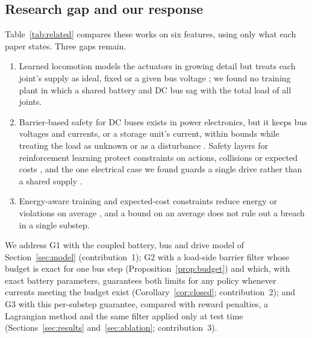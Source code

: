 \subsection{Research gap and our response}\label{sec:gap}
Table~\ref{tab:related} compares these works on six features, using only what each paper states. Three gaps remain.
\begin{enumerate}
\item[G1.] Learned locomotion models the actuators in growing detail but treats each joint's supply as ideal, fixed or a given bus voltage \cite{bjelonic2026pace,tao2026actuator,zhang2026vra}; we found no training plant in which a shared battery and DC bus sag with the total load of all joints.
\item[G2.] Barrier-based safety for DC buses exists in power electronics, but it keeps bus voltages and currents, or a storage unit's current, within bounds while treating the load as unknown or as a disturbance \cite{kosaraju2022microgrid,fu2026bess}. Safety layers for reinforcement learning protect constraints on actions, collisions or expected costs \cite{dalal2018safety,tordesillas2023rayen,he2024abs,achiam2017cpo}, and the one electrical case we found guards a single drive rather than a shared supply \cite{schenke2023safe}.
\item[G3.] Energy-aware training and expected-cost constraints reduce energy or violations on average \cite{valsecchi2024power,nai2025power,huang2026eco,achiam2017cpo}, and a bound on an average does not rule out a breach in a single substep.
\end{enumerate}
We address G1 with the coupled battery, bus and drive model of Section~\ref{sec:model} (contribution~1); G2 with a load-side barrier filter whose budget is exact for one bus step (Proposition~\ref{prop:budget}) and which, with exact battery parameters, guarantees both limits for any policy whenever currents meeting the budget exist (Corollary~\ref{cor:closed}; contribution~2); and G3 with this per-substep guarantee, compared with reward penalties, a Lagrangian method and the same filter applied only at test time (Sections~\ref{sec:results} and~\ref{sec:ablation}; contribution~3).

